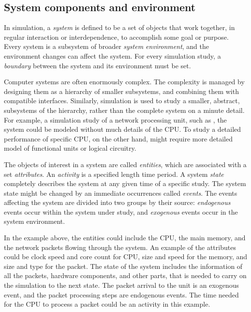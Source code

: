 \subsection{System components and environment}
\label{sec:syst-comp-envir}

In simulation, a \emph{system} is defined to be a set of objects that work together, in regular interaction or interdependence, to accomplish some goal or purpose. Every system is a subsystem of broader \emph{system environment}, and the environment changes can affect the system. For every simulation study, a \emph{boundary} between the system and its environment must be set. \cite{Banks:2010:DES}

Computer systems are often enormously complex. The complexity is managed by designing them as a hierarchy of smaller subsystems, and combining them with compatible interfaces. Similarly, simulation is used to study a smaller, abstract, subsystems of the hierarchy, rather than the complete system on a minute detail. For example, a simulation study of a network processing unit, such as \cite{cavium OCTEON}, the system could be modeled without much details of the CPU. To study a detailed performance of specific CPU, on the other hand, might require more detailed model of functional units or logical circuitry.

The objects of interest in a system are called \emph{entities}, which are associated with a set \emph{attributes}. An \emph{activity} is a specified length time period. A system \emph{state} completely describes the system at any given time of a specific study. The system state might be changed by an immediate occurrences called \emph{events}. The events affecting the system are divided into two groups by their source: \emph{endogenous} events occur within the system under study, and \emph{exogenous} events occur in the system environment. \cite{Banks:2010:DES}

In the example above, the entities could include the CPU, the main memory, and the network packets flowing through the system. An example of the attributes could be clock speed and core count for CPU, size and speed for the memory, and size and type for the packet. The state of the system includes the information of all the packets, hardware components, and other parts, that is needed to carry on the simulation to the next state. The packet arrival to the unit is an exogenous event, and the packet processing steps are endogenous events. The time needed for the CPU to process a packet could be an activity in this example.

